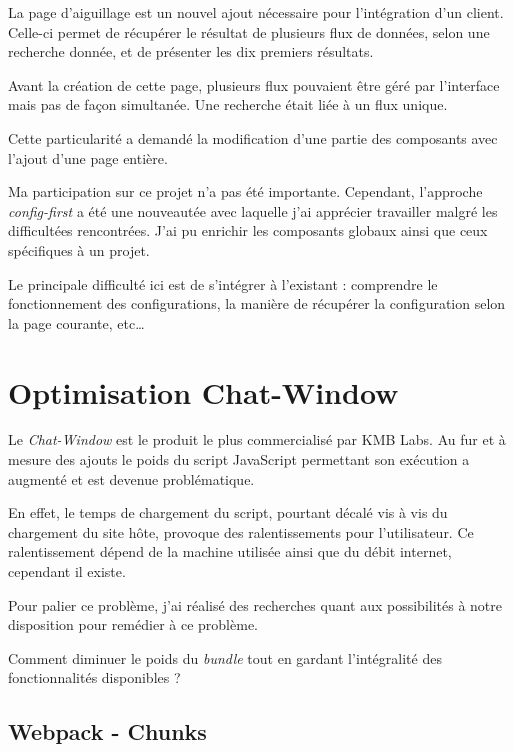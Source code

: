\documentclass[12pt,a4paper,oneside]{scrreprt}
\begin{document}
La page d'aiguillage est un nouvel ajout nécessaire pour l'intégration d'un client. Celle-ci permet de récupérer le résultat de plusieurs flux de données, selon une recherche donnée, et de présenter les dix premiers résultats.

Avant la création de cette page, plusieurs flux pouvaient être géré par l'interface mais pas de façon simultanée. Une recherche était liée à un flux unique.

Cette particularité a demandé la modification d'une partie des composants avec l'ajout d'une page entière.

\begin{info}
	Ma participation sur ce projet n'a pas été importante. Cependant, l'approche \textit{config-first} a été une nouveautée avec laquelle j'ai apprécier travailler malgré les difficultées rencontrées. J'ai pu enrichir les composants globaux ainsi que ceux spécifiques à un projet.

	Le principale difficulté ici est de s'intégrer à l'existant : comprendre le fonctionnement des configurations, la manière de récupérer la configuration selon la page courante, etc\dots
\end{info}

\section{Optimisation Chat-Window}

Le \textit{Chat-Window} est le produit le plus commercialisé par KMB Labs. Au fur et à mesure des ajouts le poids du script JavaScript permettant son exécution a augmenté et est devenue problématique.

En effet, le temps de chargement du script, pourtant décalé vis à vis du chargement du site hôte, provoque des ralentissements pour l'utilisateur. Ce ralentissement dépend de la machine utilisée ainsi que du débit internet, cependant il existe.

Pour palier ce problème, j'ai réalisé des recherches quant aux possibilités à notre disposition pour remédier à ce problème.

\begin{problem}
	Comment diminuer le poids du \textit{bundle} tout en gardant l'intégralité des fonctionnalités disponibles ?
\end{problem}

\subsection{Webpack - Chunks}
\end{document}
